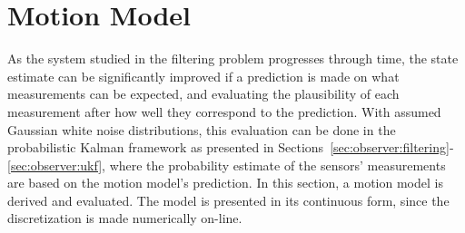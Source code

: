 \section{Motion Model}
\label{sec:observer:motionmodel}
    As the system studied in the filtering problem progresses through time,
    the state estimate can be significantly improved if a prediction
    is made on what measurements can be expected, and evaluating the plausibility
    of each measurement after how well they correspond to the prediction.
    With assumed Gaussian white noise distributions, this evaluation
    can be done in the probabilistic Kalman framework as presented in
    Sections~\ref{sec:observer:filtering}-\ref{sec:observer:ukf}, where the
    probability estimate of the sensors' measurements are based on the motion
    model's prediction. In this section, a motion model is derived and evaluated.
    The model is presented in its continuous form, since the discretization
    is made numerically on-line.


